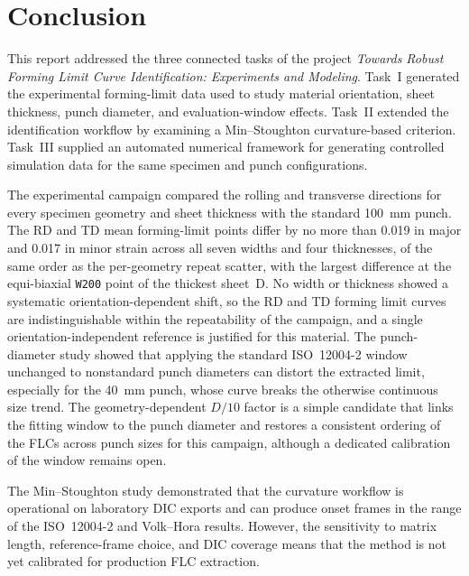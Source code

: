 \chapter{Conclusion}\label{chap:conclusion}

This report addressed the three connected tasks of the project \textit{Towards
Robust Forming Limit Curve Identification: Experiments and Modeling}. Task~I
generated the experimental forming-limit data used to study material
orientation, sheet thickness, punch diameter, and evaluation-window effects.
Task~II extended the identification workflow by examining a Min--Stoughton
curvature-based criterion. Task~III supplied an automated numerical framework
for generating controlled simulation data for the same specimen and punch
configurations.

The experimental campaign compared the rolling and transverse directions for
every specimen geometry and sheet thickness with the standard
\SI{100}{\milli\meter} punch. The RD and TD mean forming-limit
points differ by no more than \num{0.019} in major and \num{0.017} in minor
strain across all seven widths and four thicknesses, of the same order as the
per-geometry repeat scatter, with the largest difference at the equi-biaxial
\texttt{W200} point of the thickest sheet~D. No width or thickness showed a systematic
orientation-dependent shift, so the RD and TD forming limit curves are
indistinguishable within the repeatability of the campaign, and a single
orientation-independent reference is justified for this material. The
punch-diameter study showed that applying the standard ISO~12004-2 window
unchanged to nonstandard punch diameters can distort the extracted limit,
especially for the \SI{40}{\milli\meter} punch, whose curve breaks the
otherwise continuous size trend. The geometry-dependent $D/10$ factor is a
simple candidate that links the fitting window to the punch diameter and
restores a consistent ordering of the FLCs across punch sizes for this
campaign, although a dedicated calibration of the window remains open.

The Min--Stoughton study demonstrated that the curvature workflow is
operational on laboratory DIC exports and can produce onset frames in the range
of the ISO~12004-2 and Volk--Hora results. However, the sensitivity to matrix
length, reference-frame choice, and DIC coverage means that the method is not
yet calibrated for production FLC extraction.

